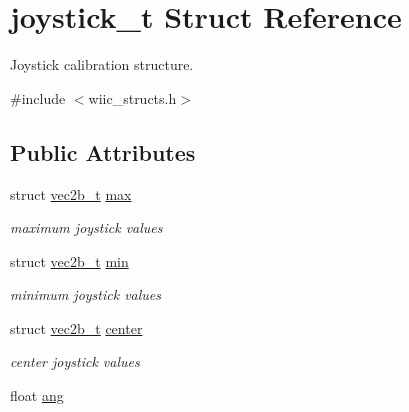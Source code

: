 \hypertarget{structjoystick__t}{\section{joystick\-\_\-t Struct Reference}
\label{structjoystick__t}
}


Joystick calibration structure.  




{\ttfamily \#include $<$wiic\-\_\-structs.\-h$>$}

\subsection*{Public Attributes}
\begin{DoxyCompactItemize}
\item 
\hypertarget{structjoystick__t_a065529eb4f4ea23be8b95f8705876b12}{struct \hyperlink{structvec2b__t}{vec2b\-\_\-t} \hyperlink{structjoystick__t_a065529eb4f4ea23be8b95f8705876b12}{max}}\label{structjoystick__t_a065529eb4f4ea23be8b95f8705876b12}

\begin{DoxyCompactList}\small\item\em maximum joystick values \end{DoxyCompactList}\item 
\hypertarget{structjoystick__t_aff984e44734968b8f8fdbd52ea8aeb4f}{struct \hyperlink{structvec2b__t}{vec2b\-\_\-t} \hyperlink{structjoystick__t_aff984e44734968b8f8fdbd52ea8aeb4f}{min}}\label{structjoystick__t_aff984e44734968b8f8fdbd52ea8aeb4f}

\begin{DoxyCompactList}\small\item\em minimum joystick values \end{DoxyCompactList}\item 
\hypertarget{structjoystick__t_a7f37b3f10761fd35fe0375377073ac44}{struct \hyperlink{structvec2b__t}{vec2b\-\_\-t} \hyperlink{structjoystick__t_a7f37b3f10761fd35fe0375377073ac44}{center}}\label{structjoystick__t_a7f37b3f10761fd35fe0375377073ac44}

\begin{DoxyCompactList}\small\item\em center joystick values \end{DoxyCompactList}\item 
\hypertarget{structjoystick__t_a59aa4a12fedb3126f21345905d824fc1}{float \hyperlink{structjoystick__t_a59aa4a12fedb3126f21345905d824fc1}{ang}}\label{structjoystick__t_a59aa4a12fedb3126f21345905d824fc1}


\end{DoxyCompactItemize}

